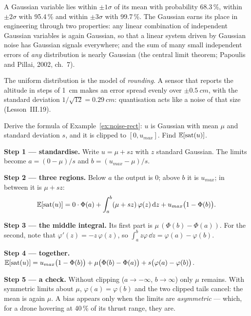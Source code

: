A Gaussian variable lies within $\pm1\sigma$ of its mean with probability 68.3\,\%, within $\pm2\sigma$ with 95.4\,\% and within $\pm3\sigma$ with 99.7\,\%. The Gaussian earns its place in engineering through two properties: any linear combination of independent Gaussian variables is again Gaussian, so that a linear system driven by Gaussian noise has Gaussian signals everywhere; and the sum of many small independent errors of \emph{any} distribution is nearly Gaussian (the central limit theorem; Papoulis and Pillai, 2002, ch.~7).

The uniform distribution is the model of \emph{rounding}. A sensor that reports the altitude in steps of \SI{1}{cm} makes an error spread evenly over $\pm\SI{0.5}{cm}$, with the standard deviation $1/\sqrt{12} = \SI{0.29}{cm}$: quantisation acts like a noise of that size (Lesson~III.19).

\begin{example}
\label{ex:E-clip}
Derive the formula of Example~\ref{ex:noise-rect}: $u$ is Gaussian with mean $\mu$ and standard deviation $s$, and it is clipped to $[0, u_{max}]$. Find $\mathbb{E}[\operatorname{sat}(u)]$.

\textbf{Step 1 — standardise.} Write $u = \mu + s z$ with $z$ standard Gaussian. The limits become $a = (0 - \mu)/s$ and $b = (u_{max} - \mu)/s$.

\textbf{Step 2 — three regions.} Below $a$ the output is 0; above $b$ it is $u_{max}$; in between it is $\mu + sz$:
\begin{equation*}
  \mathbb{E}[\operatorname{sat}(u)] = 0 \cdot \Phi(a) + \int_a^b(\mu + sz)\,\varphi(z)\,\mathrm{d} z + u_{max}\big(1 - \Phi(b)\big) .
\end{equation*}

\textbf{Step 3 — the middle integral.} Its first part is $\mu\,(\Phi(b) - \Phi(a))$. For the second, note that $\varphi'(z) = -z\,\varphi(z)$, so $\int_a^b z\varphi\,\dd z = \varphi(a) - \varphi(b)$.

\textbf{Step 4 — together.} $\mathbb{E}[\operatorname{sat}(u)] = u_{max}\big(1 - \Phi(b)\big) + \mu\big(\Phi(b) - \Phi(a)\big) + s\big(\varphi(a) - \varphi(b)\big)$.

\textbf{Step 5 — a check.} Without clipping ($a \to -\infty$, $b \to \infty$) only $\mu$ remains. With symmetric limits about $\mu$, $\varphi(a) = \varphi(b)$ and the two clipped tails cancel: the mean is again $\mu$. A bias appears only when the limits are \emph{asymmetric} — which, for a drone hovering at 40\,\% of its thrust range, they are.
\end{example}


